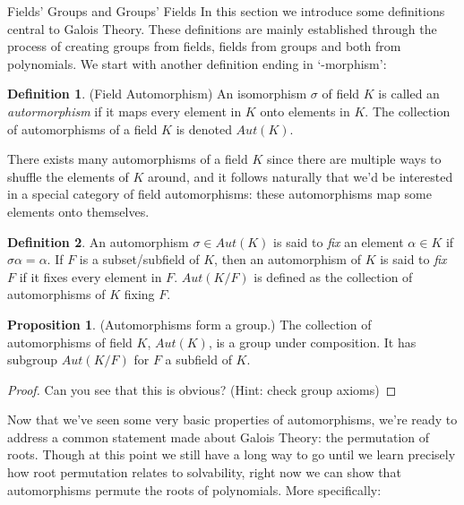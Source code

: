 \documentclass[12pt]{article}
\theoremstyle{definition}
\newtheorem{definition}{Definition}[section]
\theoremstyle{definition}
\theoremstyle{definition}
\theoremstyle{definition}
\theoremstyle{definition}
\newtheorem{proposition}{Proposition}[section]
\theoremstyle{definition}
\begin{document}
\begin{section}{Fields' Groups and Groups' Fields}
    In this section we introduce some definitions central to Galois Theory. These definitions are mainly established through the process of 
    creating groups from fields, fields from groups and both from polynomials. We start with another definition ending in `-morphism':
    \begin{definition}{(Field Automorphism)}
        An isomorphism \(\sigma\) of field \(K\) is called an \textit{autormorphism} if it maps every element in \(K\) onto elements in \(K\).
        The collection of automorphisms of a field \(K\) is denoted \(Aut(K)\).
    \end{definition}
    There exists many automorphisms of a field \(K\) since there are multiple ways to shuffle the elements of \(K\) around, and it follows naturally 
    that we'd be interested in a special category of field automorphisms: these automorphisms map some elements onto themselves.
    \begin{definition}
        An automorphism \(\sigma\in Aut(K)\) is said to \textit{fix} an element \(\alpha \in K\) if \(\sigma \alpha = \alpha\). If \(F\) is a subset/subfield 
        of \(K\), then an automorphism of \(K\) is said to \textit{fix \(F\)} if it fixes every element in \(F\). \(Aut(K/F)\) is defined as the collection 
        of automorphisms of \(K\) fixing \(F\).
    \end{definition}

    \begin{proposition}{(Automorphisms form a group.)}
        The collection of automorphisms of field \(K\), \(Aut(K)\), is a group under composition. It has subgroup \(Aut(K/F)\) for \(F\) a subfield of \(K\).
        \begin{proof}
            Can you see that this is obvious? (Hint: check group axioms)
        \end{proof}
    \end{proposition}

    Now that we've seen some very basic properties of automorphisms, we're ready to address a common statement made about Galois Theory: the permutation of roots. 
    Though at this point we still have a long way to go until we learn precisely how root permutation relates to solvability, right now we can show that automorphisms 
    permute the roots of polynomials. More specifically:


\end{section}
\end{document}
